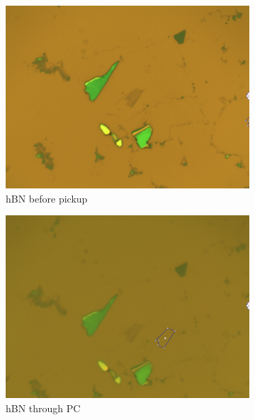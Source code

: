 \begin{figure}[H]
     \centering
     \begin{subfigure}[b]{0.4\textwidth}
         \centering
         \includegraphics[width=\textwidth]{figures/hbn_before_pickup.jpg}
         \caption{hBN before pickup}
     \end{subfigure}
    \qquad
     \begin{subfigure}[b]{0.4\textwidth}
         \centering
         \includegraphics[width=\textwidth]{figures/hbn_through_pc.jpg}
         \caption{hBN through PC}
     \end{subfigure}
    \begin{subfigure}[b]{0.4\textwidth}
         \centering

\end{subfigure}
\end{figure}
